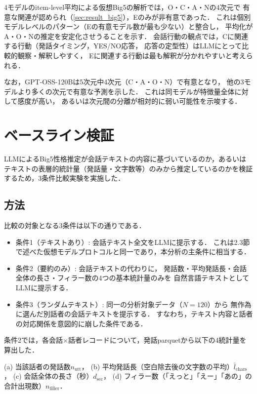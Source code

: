 \documentclass[dvipdfmx,11pt,a4paper]{bxjsarticle}
\renewcommand{\_}{\paperorigunderscore\allowbreak}%
\begin{document}
4モデルのitem-level平均による仮想Big5の解析では，O・C・A・Nの4次元で
有意な関連が認められ（\ref{sec:result_big5}），Eのみが非有意であった．
これは個別モデルレベルのパターン（Eの有意モデル数が最も少ない）と整合し，
平均化がA・O・Nの推定を安定化させうることを示す．
会話行動の観点では，Cに関連する行動（発話タイミング，YES/NO応答，
応答の定型性）はLLMにとって比較的観察・解釈しやすく，
Eに関連する行動は最も解釈が分かれやすいと考えられる．

なお，GPT-OSS-120Bは5次元中4次元（C・A・O・N）で有意となり，
他の3モデルより多くの次元で有意な予測を示した．
これは同モデルが特徴量全体に対して感度が高い，
あるいは次元間の分離が相対的に弱い可能性を示唆する．





\section{ベースライン検証}
\label{sec:baseline_validation}

LLMによるBig5性格推定が会話テキストの内容に基づいているのか，あるいはテキストの表層的統計量（発話量・文字数等）のみから推定しているのかを検証するため，3条件比較実験を実施した．

\subsection{方法}
\label{sec:baseline_validation_method}

比較の対象となる3条件は以下の通りである．

\begin{itemize}
  \item 条件1（テキストあり）: 会話テキスト全文をLLMに提示する．
    これは2.3節で述べた仮想モデルプロトコルと同一であり，本分析の主条件に相当する．
  \item 条件2（要約のみ）: 会話テキストの代わりに，
    発話数・平均発話長・会話全体の長さ・フィラー数の4つの基本統計量のみを
    自然言語テキストとしてLLMに提示する．
  \item 条件3（ランダムテキスト）: 同一の分析対象データ（$N = 120$）から
    無作為に選んだ別話者の会話テキストを提示する．
    すなわち，テキスト内容と話者の対応関係を意図的に崩した条件である．
\end{itemize}

条件2では，各会話$\times$話者レコードについて，発話parquetから以下の4統計量を算出した．

(a) 当該話者の発話数$n_{\text{utt}}$，
(b) 平均発話長（空白除去後の文字数の平均）$\bar{l}_{\text{chars}}$，
(c) 会話全体の長さ（秒）$d_{\text{sec}}$，
(d) フィラー数（「えっと」「えー」「あの」の合計出現数）$n_{\text{filler}}$．
\end{document}
